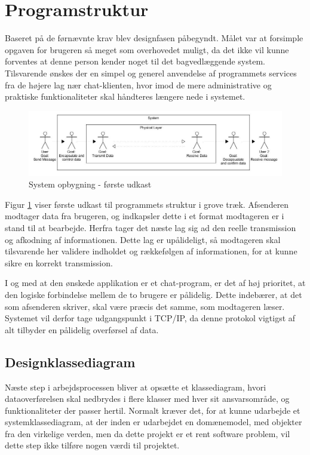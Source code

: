 \section{Programstruktur}
Baseret på de førnævnte krav blev designfasen påbegyndt. Målet var at forsimple opgaven for brugeren så meget som overhovedet muligt, da det ikke vil kunne forventes at denne person kender noget til det bagvedlæggende system. 
Tilsvarende ønskes der en simpel og generel anvendelse af programmets services fra de højere lag nær chat-klienten, hvor imod de mere administrative og praktiske funktionaliteter skal håndteres længere nede i systemet.

\begin{figure}[h!]
\centering
\includegraphics[scale=0.5]{Billeder/ProgramOpbygning1.JPG}
\caption{System opbygning - første udkast}
\label{fig:Blokdiagram}
\end{figure}

Figur \ref{fig:Blokdiagram} viser første udkast til programmets struktur i grove træk. Afsenderen modtager data fra brugeren, og indkapsler dette i et format modtageren er i stand til at bearbejde. Herfra tager det næste lag sig ad den reelle transmission og afkodning af informationen. Dette lag er upålideligt, så modtageren skal tilsvarende her validere indholdet og rækkefølgen af informationen, for at kunne sikre en korrekt transmission.

I og med at den ønskede applikation er et chat-program, er det af høj prioritet, at den logiske forbindelse mellem de to brugere er pålidelig. Dette indebærer, at det som afsenderen skriver, skal være præcis det samme, som modtageren læser. Systemet vil derfor tage udgangspunkt i TCP/IP, da denne protokol vigtigst af alt tilbyder en pålidelig overførsel af data. 


\subsection{Designklassediagram}
Næste step i arbejdsprocessen bliver at opsætte et klassediagram, hvori dataoverførelsen skal nedbrydes i flere klasser med hver sit ansvarsområde, og funktionaliteter der passer hertil. Normalt kræver det, for at kunne udarbejde et systemklassediagram, at der inden er udarbejdet en domænemodel, med objekter fra den virkelige verden, men da dette projekt er et rent software problem, vil dette step ikke tilføre nogen værdi til projektet. 

